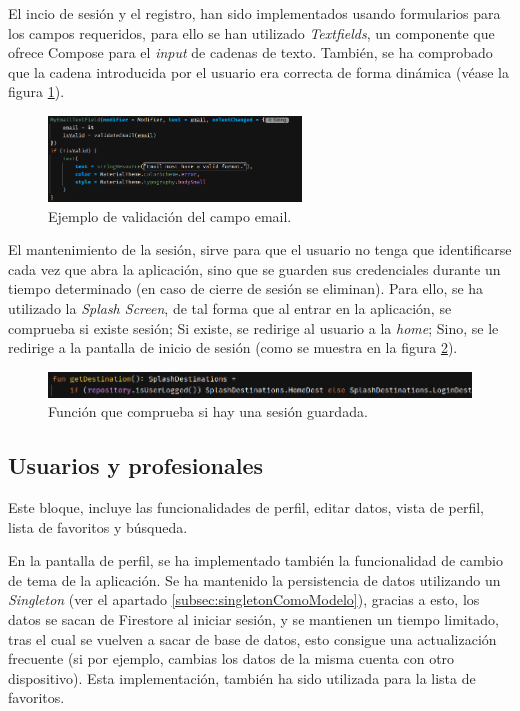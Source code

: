 El incio de sesión y el registro, han sido implementados usando formularios para los campos requeridos, para ello se han utilizado \textit{Textfields}, un componente que ofrece Compose para el \textit{input} de cadenas de texto. También, se ha comprobado que la cadena introducida por el usuario era correcta de forma dinámica (véase la figura \ref{fig:textfield}). 
\begin{figure}[h]
    \centering
    \includegraphics[width = 0.6\textwidth]{Imagenes/Fuentes/textfield.png}
    \caption{Ejemplo de validación del campo email.}
    \label{fig:textfield}
\end{figure}

El mantenimiento de la sesión, sirve para que el usuario no tenga que identificarse cada vez que abra la aplicación, sino que se guarden sus credenciales durante un tiempo determinado (en caso de cierre de sesión se eliminan). Para ello, se ha utilizado la \textit{Splash Screen}, de tal forma que al entrar en la aplicación, se comprueba si existe sesión; Si existe, se redirige al usuario a la \textit{home}; Sino, se le redirige a la pantalla de inicio de sesión (como se muestra en la figura \ref{fig:splashDest}). 
\begin{figure}[h]
    \centering
    \includegraphics[width = 1\textwidth]{Imagenes/Fuentes/splashDest.png}
    \caption{Función que comprueba si hay una sesión guardada.}
    \label{fig:splashDest}
\end{figure}

\subsection{Usuarios y profesionales} 
Este bloque, incluye las funcionalidades de perfil, editar datos, vista de perfil, lista de favoritos y búsqueda.

En la pantalla de perfil, se ha implementado también la funcionalidad de cambio de tema de la aplicación. Se ha mantenido la persistencia de datos utilizando un \textit{Singleton} (ver el apartado \ref{subsec:singletonComoModelo}), gracias a esto, los datos se sacan de Firestore al iniciar sesión, y se mantienen un tiempo limitado, tras el cual se vuelven a sacar de base de datos, esto consigue una actualización frecuente (si por ejemplo, cambias los datos de la misma cuenta con otro dispositivo). Esta implementación, también ha sido utilizada para la lista de favoritos.

